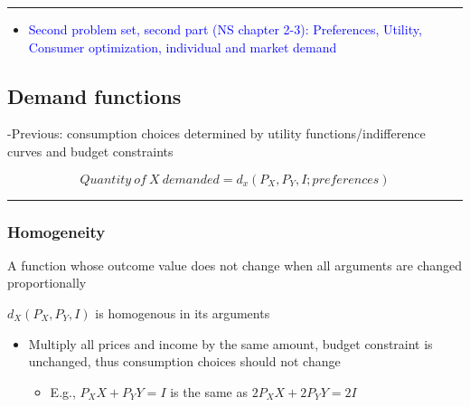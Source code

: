 \documentclass[]{article}
\providecommand{\tightlist}{%
  \setlength{\itemsep}{0pt}\setlength{\parskip}{0pt}}
\begin{document}
\begin{center}\rule{0.5\linewidth}{\linethickness}\end{center}

\begin{itemize}
\tightlist
\item
  \textcolor{blue}{Second problem set, second part (NS chapter 2-3): Preferences, Utility, Consumer optimization, individual and market demand}
\end{itemize}

\hypertarget{demand-functions}{%
\subsection{Demand functions}\label{demand-functions}}

-Previous: consumption choices determined by utility functions/indifference curves and budget constraints

\bigskip

\[Quantity \: of \: X \: demanded = d_x(P_X, P_Y, I; preferences)\]

\begin{center}\rule{0.5\linewidth}{\linethickness}\end{center}

\hypertarget{homogeneity}{%
\subsubsection{Homogeneity}\label{homogeneity}}

\begin{description}
\tightlist
\item[Homogenous (of degree zero) (demand) function]
A function whose outcome value does not change when all arguments are changed proportionally
\end{description}

\bigskip

\(d_X(P_X,P_Y,I)\) is homogenous in its arguments

\bigskip

\begin{itemize}
\tightlist
\item
  Multiply all prices and income by the same amount, budget constraint is unchanged, thus consumption choices should not change

  \begin{itemize}
  \tightlist
  \item
    E.g., \(P_X X + P_Y Y = I\) is the same as \(2P_X X + 2P_Y Y = 2I\)
  \end{itemize}
\end{itemize}
\end{document}

